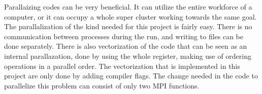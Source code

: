 %
Parallaizing codes can be very beneficial. It can utilize the entire workforce
of a computer, or it can occupy a whole super cluster working towards the same goal.
The parallalization of the kind needed for this project is fairly easy. 
There is no communication between processes during the run, and writing to files can be done separately. 
There is also vectorization of the code that can be seen as an internal parallazation, done by using the whole register, making use of ordering operations
in a parallel order. The vectorization that is implemented in this project are 
only done by adding compiler flags.
The change needed in the code to parallelize this problem can consist of only two MPI functions.

%
